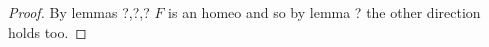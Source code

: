 
\begin{proof}
By lemmas ?,?,? $F$ is an homeo and so by lemma ? the other direction holds too.
\end{proof}
